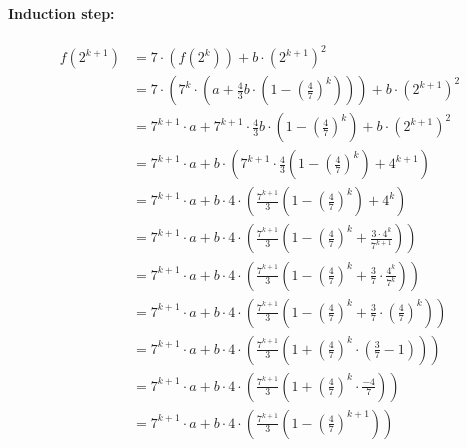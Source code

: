 \documentclass{article}
\begin{document}
\begin{enumerate}
{\begin{enumerate}[label={(\arabic*)}]
{                    \paragraph*{Induction step:}
                    \begin{displaymath}
                        \begin{aligned}
                            f(2^{k+1})
                            &= 7\cdot\left(f(2^k)\right) + b\cdot\left(2^{k+1}\right)^2 \\
                            &= 7\cdot\left(7^k \cdot \left( a + \frac{4}{3}b \cdot \left(1 - \left(\frac47\right)^{k}\right) \right)\right) + b\cdot\left(2^{k+1}\right)^2 \\
                            &= 7^{k + 1} \cdot a + 7^{k + 1} \cdot \frac{4}{3}b \cdot \left(1 - \left(\frac47\right)^{k}\right) + b\cdot\left(2^{k+1}\right)^2 \\
                            &= 7^{k + 1} \cdot a + b \cdot \left(7^{k + 1} \cdot \frac{4}{3}\left(1 - \left(\frac47\right)^{k}\right) + 4^{k+1}\right) \\
                            &= 7^{k + 1} \cdot a + b \cdot 4 \cdot \left(\frac{7^{k + 1}}{3}\left(1 - \left(\frac47\right)^{k}\right) + 4^k\right) \\
                            &= 7^{k + 1} \cdot a + b \cdot 4 \cdot \left(\frac{7^{k + 1}}{3}\left(1 - \left(\frac47\right)^{k} + \frac{3\cdot4^k}{7^{k+1}}\right)\right) \\
                            &= 7^{k + 1} \cdot a + b \cdot 4 \cdot \left(\frac{7^{k + 1}}{3}\left(1 - \left(\frac47\right)^{k} + \frac{3}{7}\cdot\frac{4^k}{7^k}\right)\right) \\
                            &= 7^{k + 1} \cdot a + b \cdot 4 \cdot \left(\frac{7^{k + 1}}{3}\left(1 - \left(\frac47\right)^{k} + \frac{3}{7}\cdot\left(\frac47\right)^k\right)\right) \\
                            &= 7^{k + 1} \cdot a + b \cdot 4 \cdot \left(\frac{7^{k + 1}}{3}\left(1 + \left(\frac47\right)^{k}\cdot\left(\frac{3}{7} - 1\right)\right)\right) \\
                            &= 7^{k + 1} \cdot a + b \cdot 4 \cdot \left(\frac{7^{k + 1}}{3}\left(1 + \left(\frac47\right)^{k}\cdot\frac{-4}{7}\right)\right) \\
                            &= 7^{k + 1} \cdot a + b \cdot 4 \cdot \left(\frac{7^{k + 1}}{3}\left(1 - \left(\frac47\right)^{k + 1}\right)\right) \\

\end{aligned}
\end{displaymath}}
\end{enumerate}}
\end{enumerate}
\end{document}
